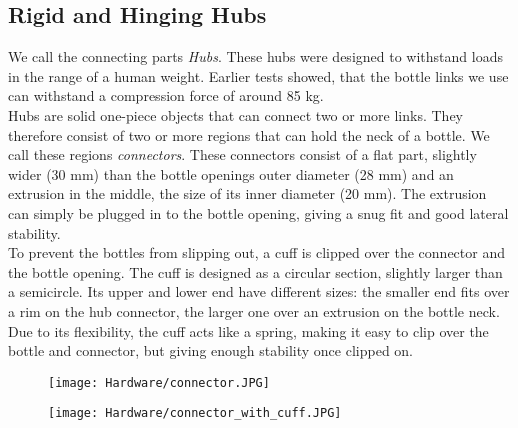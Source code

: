 \subsection{Rigid and Hinging Hubs}
We call the connecting parts \textit{Hubs}. These hubs were designed to withstand loads in the range of a human weight. Earlier tests showed, that the bottle links we use can withstand a compression force of around 85 kg.\\
Hubs are solid one-piece objects that can connect two or more links. They therefore consist of two or more regions that can hold the neck of a bottle. We call these regions \textit{connectors}. These connectors consist of a flat part, slightly wider (30 mm) than the bottle openings outer diameter (28 mm) and an extrusion in the middle, the size of its inner diameter (20 mm). The extrusion can simply be plugged in to the bottle opening, giving a snug fit and good lateral stability.\\
To prevent the bottles from slipping out, a cuff is clipped over the connector and the bottle opening. The cuff is designed as a circular section, slightly larger than a semicircle. Its upper and lower end have different sizes: the smaller end fits over a rim on the hub connector, the larger one over an extrusion on the bottle neck. Due to its flexibility, the cuff acts like a spring, making it easy to clip over the bottle and connector, but giving enough stability once clipped on.
\begin{figure}
  \centering
  \begin{minipage}{.5\textwidth}
    \centering
    \texttt{[image: Hardware/connector.JPG]}
    \label{fig:connector}
  \end{minipage}%
  \begin{minipage}{.5\textwidth}
    \centering
    \texttt{[image: Hardware/connector\_with\_cuff.JPG]}
    \label{fig:connector_with_cuff}
  \end{minipage}
\end{figure}

